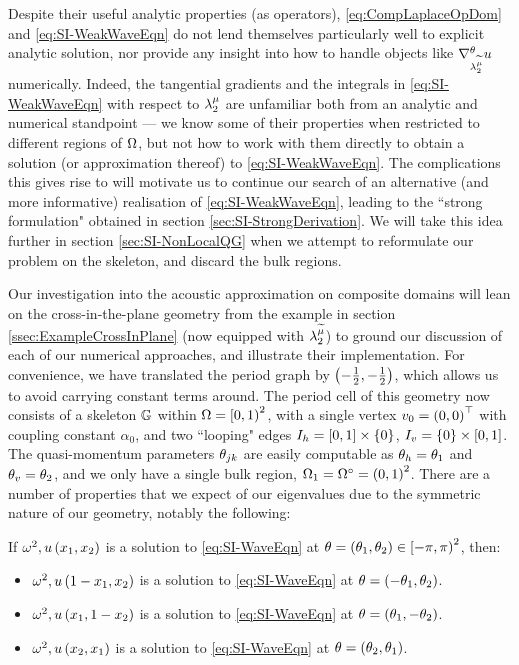 Despite their useful analytic properties (as operators), \eqref{eq:CompLaplaceOpDom} and \eqref{eq:SI-WeakWaveEqn} do not lend themselves particularly well to explicit analytic solution, nor provide any insight into how to handle objects like $\nabla^{\theta}_{\lambda_2^{\widetilde{\mu}}}u$ numerically.
Indeed, the tangential gradients and the integrals in \eqref{eq:SI-WeakWaveEqn} with respect to $\lambda_2^{\mu}$ are unfamiliar both from an analytic and numerical standpoint --- we know some of their properties when restricted to different regions of $\Omega$, but not how to work with them directly to obtain a solution (or approximation thereof) to \eqref{eq:SI-WeakWaveEqn}.
The complications this gives rise to will motivate us to continue our search of an alternative (and more informative) realisation of \eqref{eq:SI-WeakWaveEqn}, leading to the ``strong formulation" obtained in section \ref{sec:SI-StrongDerivation}.
We will take this idea further in section \ref{sec:SI-NonLocalQG} when we attempt to reformulate our problem on the skeleton, and discard the bulk regions.

Our investigation into the acoustic approximation on composite domains will lean on the cross-in-the-plane geometry from the example in section \ref{ssec:ExampleCrossInPlane} (now equipped with $\lambda_2^{\widetilde{\mu}}$) to ground our discussion of each of our numerical approaches, and illustrate their implementation.
For convenience, we have translated the period graph by $\left( -\frac{1}{2},-\frac{1}{2} \right)$, which allows us to avoid carrying constant terms around.
The period cell of this geometry now consists of a skeleton $\mathbb{G}$ within $\Omega=\left[0,1\right)^2$, with a single vertex $v_0=\left( 0,0 \right)^\top$ with coupling constant $\alpha_0$, and two ``looping" edges $I_h = \left[ 0,1 \right]\times\left\{ 0 \right\}$, $I_v=\left\{ 0 \right\}\times\left[ 0,1 \right]$.
The quasi-momentum parameters $\theta_{jk}$ are easily computable as $\theta_h = \theta_1$ and $\theta_v = \theta_2$, and we only have a single bulk region, $\Omega_1 = \Omega^{\circ}=\left( 0,1 \right)^2$.
There are a number of properties that we expect of our eigenvalues due to the symmetric nature of our geometry, notably the following:
\begin{prop} \label{prop:CrossInPlaneSymmetries}
	If $\omega^2, u\left( x_1,x_2 \right)$ is a solution to \eqref{eq:SI-WaveEqn} at $\theta = \left( \theta_1,\theta_2 \right)\in\left[-\pi,\pi\right)^2$, then:
	\begin{itemize}
		\item $\omega^2, u\left( 1-x_1,x_2 \right)$ is a solution to \eqref{eq:SI-WaveEqn} at $\theta = \left( -\theta_1, \theta_2 \right)$.
		\item $\omega^2, u\left( x_1,1-x_2 \right)$ is a solution to \eqref{eq:SI-WaveEqn} at $\theta = \left( \theta_1, -\theta_2 \right)$.
		\item $\omega^2, u\left( x_2,x_1 \right)$ is a solution to \eqref{eq:SI-WaveEqn} at $\theta = \left( \theta_2, \theta_1 \right)$.
	\end{itemize}
\end{prop}

